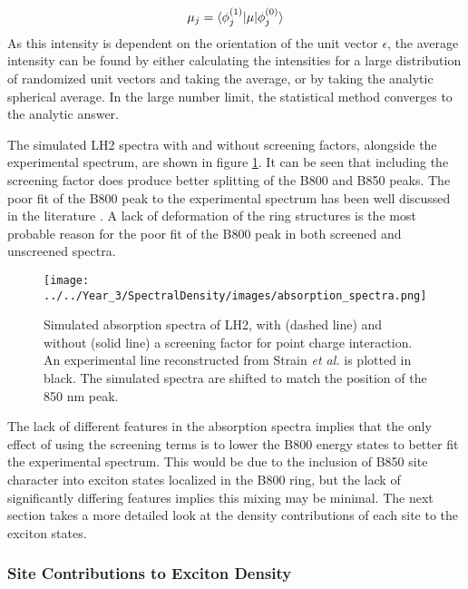 \begin{equation}
    \mathbf{\mu}_j = \braket{\phi_j^{\left(1\right)}|\mathbf{\mu}|\phi_j^{\left(0\right)}}
\end{equation}
%
As this intensity is dependent on the orientation of the unit vector $\epsilon$,
the average intensity can be found by either calculating the intensities for a large
distribution of randomized unit vectors and taking the average, or by taking the
analytic spherical average. In the large number limit, the statistical method converges
to the analytic answer.

The simulated LH2 spectra with and without screening factors, alongside the experimental 
spectrum, are shown in figure \ref{fig:LH2_abs_spec}. It can be seen that including
the screening factor does produce better splitting of the B800 and B850 peaks. The
poor fit of the B800 peak to the experimental spectrum has been well discussed in
the literature \cite{Stross2016, Mennucci2019}. A lack of deformation of the ring 
structures is the most probable reason for the poor fit of the B800 peak in both 
screened and unscreened spectra.

\begin{figure}
    \centering
    \texttt{[image: ../../Year\_3/SpectralDensity/images/absorption\_spectra.png]}
    \caption{Simulated absorption spectra of LH2, with (dashed line) and without 
    (solid line) a screening factor for point charge interaction. An experimental
    line reconstructed from Strain \emph{et al.} \cite{Strain1963} is plotted in
    black. The simulated spectra are shifted to match the position of the 850 nm
    peak.}
    \label{fig:LH2_abs_spec}
\end{figure}

The lack of different features in the absorption spectra implies that the only effect
of using the screening terms is to lower the B800 energy states to better fit the
experimental spectrum. This would be due to the inclusion of B850 site character
into exciton states localized in the B800 ring, but the lack of significantly differing
features implies this mixing may be minimal. The next section takes a more detailed
look at the density contributions of each site to the exciton states.

\subsubsection{Site Contributions to Exciton Density}
\label{subsubsec:site_dens}

